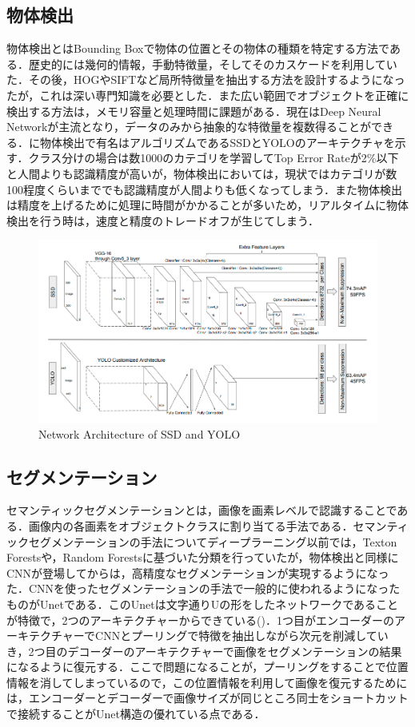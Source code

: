 \subsection*{物体検出}
物体検出とはBounding Boxで物体の位置とその物体の種類を特定する方法である．歴史的には幾何的情報，手動特徴量，そしてそのカスケードを利用していた．その後，HOG\cite{HOG}やSIFT\cite{SIFT}など局所特徴量を抽出する方法を設計するようになったが，これは深い専門知識を必要とした．また広い範囲でオブジェクトを正確に検出する方法は，メモリ容量と処理時間に課題がある．現在はDeep Neural Networkが主流となり，データのみから抽象的な特徴量を複数得ることができる．に物体検出で有名はアルゴリズムであるSSDとYOLOのアーキテクチャを示す．クラス分けの場合は数1000のカテゴリを学習してTop Error Rateが2\%以下と人間よりも認識精度が高いが，物体検出においては，現状ではカテゴリが数100程度くらいまででも認識精度が人間よりも低くなってしまう．また物体検出は精度を上げるために処理に時間がかかることが多いため，リアルタイムに物体検出を行う時は，速度と精度のトレードオフが生じてしまう．

\begin{figure}[H]
	\centering
	\includegraphics[width=0.7\linewidth]{fig/yolo_ssd.png}
	\caption{Network Architecture of SSD and YOLO\cite{SSD}}
	\label{fig:SSD}
\end{figure}

\subsection*{セグメンテーション}
セマンティックセグメンテーションとは，画像を画素レベルで認識することである．画像内の各画素をオブジェクトクラスに割り当てる手法である．セマンティックセグメンテーションの手法についてディープラーニング以前では，Texton Forests\cite{要出典}や，Random Forests\cite{要出典}に基づいた分類を行っていたが，物体検出と同様にCNNが登場してからは，高精度なセグメンテーションが実現するようになった．CNNを使ったセグメンテーションの手法で一般的に使われるようになったものがUnetである\cite{Unet}．このUnetは文字通りUの形をしたネットワークであることが特徴で，2つのアーキテクチャーからできている()．1つ目がエンコーダーのアーキテクチャーでCNNとプーリングで特徴を抽出しながら次元を削減していき，2つ目のデコーダーのアーキテクチャーで画像をセグメンテーションの結果になるように復元する．ここで問題になることが，プーリングをすることで位置情報を消してしまっているので，この位置情報を利用して画像を復元するためには，エンコーダーとデコーダーで画像サイズが同じところ同士をショートカットで接続することがUnet構造の優れている点である．

